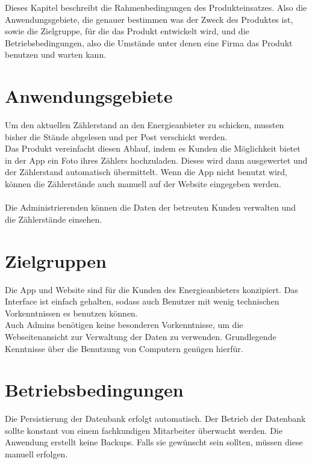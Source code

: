 Dieses Kapitel beschreibt die Rahmenbedingungen des Produkteinsatzes. Also die Anwendungsgebiete, die genauer bestimmen was der Zweck des Produktes ist, sowie die Zielgruppe, für die das Produkt entwickelt wird,
und die Betriebsbedingungen, also die Umstände unter denen eine Firma das Produkt benutzen und warten kann.

\section{Anwendungsgebiete}
	Um den aktuellen Zählerstand an den Energieanbieter zu schicken, mussten bisher die Stände abgelesen und per Post verschickt 		  
	werden. \\
	Das Produkt vereinfacht diesen Ablauf, indem es Kunden die Möglichkeit bietet in der App ein Foto ihres Zählers hochzuladen. Dieses wird dann 	
	ausgewertet und der Zählerstand  automatisch übermittelt.
	Wenn die App nicht benutzt wird, können die Zählerstände auch manuell auf der Website eingegeben werden.\\\\
	Die Administrierenden können die Daten der betreuten Kunden verwalten und die Zählerstände einsehen.
\section{Zielgruppen}
	Die App und Website sind für die Kunden des Energieanbieters konzipiert. Das Interface ist einfach gehalten, sodass auch Benutzer mit wenig technischen Vorkenntnissen es benutzen können.\\
	Auch Admins benötigen keine besonderen Vorkenntnisse, um die Webseitenansicht zur Verwaltung der Daten zu verwenden.
	Grundlegende Kenntnisse über die Benutzung von Computern genügen hierfür.
	
\section{Betriebsbedingungen}
	Die Persistierung der Datenbank erfolgt automatisch. Der Betrieb der Datenbank sollte konstant von einem fachkundigen Mitarbeiter überwacht werden.
	Die Anwendung erstellt keine Backups. Falls sie gewünscht sein sollten, müssen diese manuell erfolgen.
	
